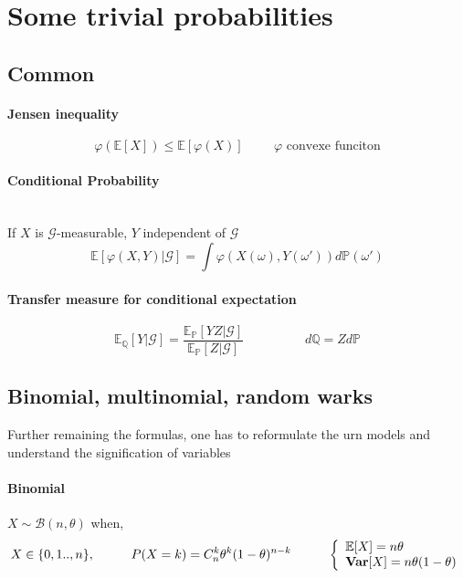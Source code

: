 \documentclass[a4paper,10pt]{article}
\begin{document}
\begin{center}\end{center}
\section{Some trivial probabilities}

\subsection{Common}
\paragraph{Jensen inequality}
\[
\varphi(\mathbb{E}[X]) \leq \mathbb{E}[\varphi(X)]
\hspace{1cm} \varphi \text{ convexe funciton}
\]
\paragraph{Conditional Probability}\mbox{} \\
If $X$ is $\mathcal{G}$-measurable, $Y$ independent of $\mathcal{G}$
\[
\mathbb{E}[\varphi(X,Y)|\mathcal{G}] = \int \varphi(X(\omega),Y(\omega '))d\mathbb{P}(\omega ')
\]
\paragraph{Transfer measure for conditional expectation}
\[
\mathbb{E}_{\mathbb{Q}}[Y|\mathcal{G}] = 
\frac{\mathbb{E}_{\mathbb{P}}[YZ|\mathcal{G}]}{\mathbb{E}_{\mathbb{P}}[Z|\mathcal{G}]}
\hspace{2cm}
d\mathbb{Q} = Z d\mathbb{P}
\]

\subsection{Binomial, multinomial, random warks}
Further remaining the formulas, one has to reformulate the urn models and understand the signification of variables
\paragraph{Binomial} $X\sim \mathcal{B}(n,\theta)$ when,
\[
X \in \{0,1 .. , n\} , 
\hspace{10mm}
P(X=k)=C^k_n\theta ^k (1-\theta)^{n-k} 
\hspace{10mm}
\left\{
\begin{array}{l}
\mathbb{E}[X]=n\theta \\
\textbf{Var}[X]=n \theta (1-\theta) 
\end{array}\right.
\]
\end{document}
